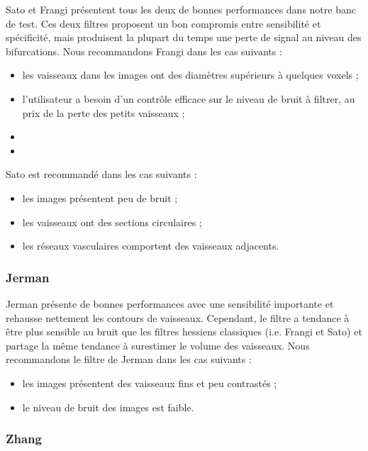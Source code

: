 Sato et Frangi présentent tous les deux de bonnes performances dans notre banc de test. Ces deux filtres proposent un bon compromis entre sensibilité et spécificité, mais produisent la plupart du temps une perte de signal au niveau des bifurcations. Nous recommandons Frangi dans les cas suivants :

\begin{itemize}
  \item les vaisseaux dans les images ont des diamètres supérieurs à quelques voxels ;
  \item l'utilisateur a besoin d'un contrôle efficace sur le niveau de bruit à filtrer, au prix de la perte des petits vaisseaux ;
  \item {}
  \item {}
\end{itemize}

Sato est recommandé dans les cas suivants :

\begin{itemize}
  \item les images présentent peu de bruit ;
  \item les vaisseaux ont des sections circulaires ;
  \item les réseaux vasculaires comportent des vaisseaux adjacents.
\end{itemize}

\subsubsection*{Jerman}

Jerman présente de bonnes performances avec une sensibilité importante et rehausse nettement les contours de vaisseaux. Cependant, le filtre a tendance à être plus sensible au bruit que les filtres hessiens classiques (i.e. Frangi et Sato) et partage la même tendance à surestimer le volume des vaisseaux. Nous recommandons le filtre de Jerman dans les cas suivants : 

\begin{itemize}
\item les images présentent des vaisseaux fins et peu contrastés ;
\item le niveau de bruit des images est faible.
\end{itemize}

\subsubsection*{Zhang}


